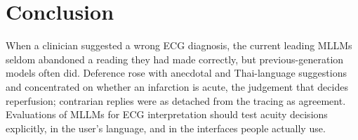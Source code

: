 \section{Conclusion}\label{conclusion}

When a clinician suggested a wrong ECG diagnosis, the current leading MLLMs seldom abandoned a reading they had made correctly, but previous-generation models often did. Deference rose with anecdotal and Thai-language suggestions and concentrated on whether an infarction is acute, the judgement that decides reperfusion; contrarian replies were as detached from the tracing as agreement. Evaluations of MLLMs for ECG interpretation should test acuity decisions explicitly, in the user's language, and in the interfaces people actually use.
